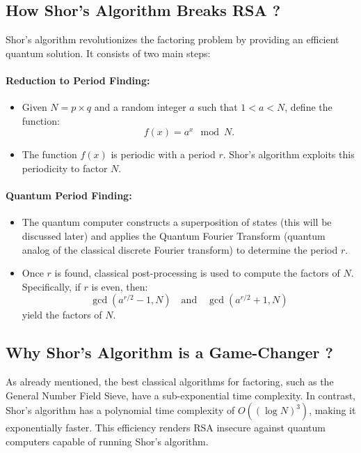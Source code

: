 \documentclass{article}
\begin{document}
\subsection*{How Shor’s Algorithm Breaks RSA ?}

Shor’s algorithm revolutionizes the factoring problem by providing an efficient quantum solution. It consists of two main steps:

\paragraph{Reduction to Period Finding:}
\begin{itemize}
    \item Given $N = p \times q$ and a random integer $a$ such that $1 < a < N$, define the function:
    \begin{equation*}
        f(x) = a^x \mod N.
    \end{equation*}
    \item The function $f(x)$ is periodic with a period $r$. Shor’s algorithm exploits this periodicity to factor $N$.
\end{itemize}

\paragraph{Quantum Period Finding:}
\begin{itemize}
    \item The quantum computer constructs a superposition of states (this will be discussed later) and applies the Quantum Fourier Transform (quantum analog of the classical discrete Fourier transform) to determine the period $r$.
    \item Once $r$ is found, classical post-processing is used to compute the factors of $N$. Specifically, if $r$ is even, then:
    \begin{equation*}
        \gcd\left(a^{r/2} - 1, N\right) \quad \text{and} \quad \gcd\left(a^{r/2} + 1, N\right)
    \end{equation*}
    yield the factors of $N$.
\end{itemize}

\subsection*{Why Shor’s Algorithm is a Game-Changer ?}

As already mentioned, the best classical algorithms for factoring, such as the General Number Field Sieve, have a sub-exponential time complexity. In contrast, Shor’s algorithm has a polynomial time complexity of $O((\log N)^3)$, making it exponentially faster. This efficiency renders RSA insecure against quantum computers capable of running Shor’s algorithm.
\end{document}
